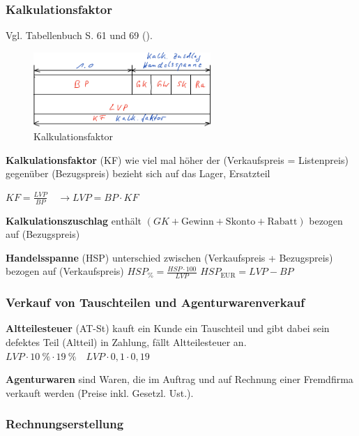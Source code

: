\subsubsection{Kalkulationsfaktor}\label{kalkulationsfaktor}

Vgl. Tabellenbuch S. 61 und 69 (\textcite{bell:2021:tabellenbuchKfz}).

\begin{figure}[!ht]%
\centering
\includegraphics[width=0.6\textwidth]{images/Skizze/03_Kalkulationsfaktor_Skizze.pdf}
\caption{Kalkulationsfaktor}
\end{figure}

\textbf{Kalkulationsfaktor} (KF) wie viel mal höher der (Verkaufspreis =
Listenpreis) gegenüber (Bezugspreis) bezieht sich auf das Lager,
Ersatzteil

$\boxed{KF = \frac{LVP}{BP}} \quad \to \boxed{LVP = BP \cdot KF}$

\textbf{Kalkulationszuschlag} enthält
$(GK + \text{Gewinn} + \text{Skonto} + \text{Rabatt})$ bezogen auf
(Bezugspreis)

\textbf{Handelsspanne} (HSP) unterschied zwischen (Verkaufspreis +
Bezugspreis) bezogen auf (Verkaufspreis)
$\boxed{HSP_\% = \frac{HSP \cdot 100}{LVP}}$
$\boxed{HSP_\text{EUR} = LVP - BP}$

\subsubsection{Verkauf von Tauschteilen und
Agenturwarenverkauf}\label{verkauf-von-tauschteilen-und-agenturwarenverkauf}

\textbf{Altteilesteuer} (AT-St) kauft ein Kunde ein Tauschteil und gibt
dabei sein defektes Teil (Altteil) in Zahlung, fällt Altteilesteuer an.
$\boxed{LVP \cdot 10~\% \cdot 19~\%} \quad \boxed{LVP \cdot 0,1 \cdot 0,19}$

\textbf{Agenturwaren} sind Waren, die im Auftrag und auf Rechnung einer
Fremdfirma verkauft werden (Preise inkl. Gesetzl. Ust.).

\subsubsection{Rechnungserstellung}\label{rechnungserstellung}

